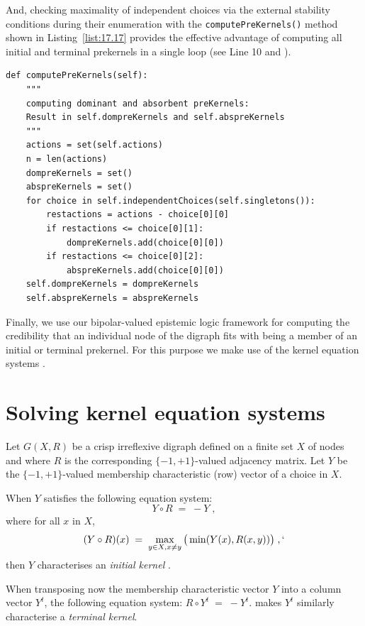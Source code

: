 And, checking maximality of independent choices via the external stability conditions during their enumeration with the \texttt{computePreKernels()} method shown in Listing~\vref{list:17.17} provides the effective advantage of computing all initial and terminal prekernels in a single loop (see Line 10 and \citep{BIS-2006b}).
\begin{lstlisting}[caption={Computing dominant and absorbent preKernels},label=list:17.17]
def computePreKernels(self):
    """
    computing dominant and absorbent preKernels:
    Result in self.dompreKernels and self.abspreKernels
    """
    actions = set(self.actions)
    n = len(actions)
    dompreKernels = set()
    abspreKernels = set()
    for choice in self.independentChoices(self.singletons()):
        restactions = actions - choice[0][0]
        if restactions <= choice[0][1]:
            dompreKernels.add(choice[0][0])
        if restactions <= choice[0][2]:
            abspreKernels.add(choice[0][0])
    self.dompreKernels = dompreKernels
    self.abspreKernels = abspreKernels
\end{lstlisting}
 
Finally, we use our bipolar-valued epistemic logic framework for computing the credibility that an individual node of the digraph fits with being a member of an initial or terminal prekernel. For this purpose we make use of the kernel equation systems \citep{BER-1958,KIT-1993}.

\section{Solving kernel equation systems}
\label{sec:17.6}

Let $G(X,R)$ be a crisp irreflexive digraph defined on a finite set $X$ of nodes and where $R$ is the corresponding $\{-1,+1\}$-valued adjacency matrix. Let $Y$ be the $\{-1,+1\}$-valued membership characteristic (row) vector of a choice in $X$.

When $Y$ satisfies the following equation system:
\begin{equation}
  Y \circ R \; = \; -Y\;,
\end{equation}
where for all $x$ in $X$,
\begin{equation}\label{eq:17.2}
     (Y \circ R)(x) \; = \; \max_{y \in X, x \neq y} \big ( \min(Y(x), R(x,y))\big)\;,`
\end{equation}
then $Y$ characterises an \emph{initial kernel} \citep*{BIS-2006a,BIS-2006b}.

When transposing now the membership characteristic vector $Y$ into a column vector $Y^t$, the following equation system: $R \circ Y^t \; = \; -Y^t$.
makes $Y^t$ similarly characterise a \emph{terminal kernel}.


